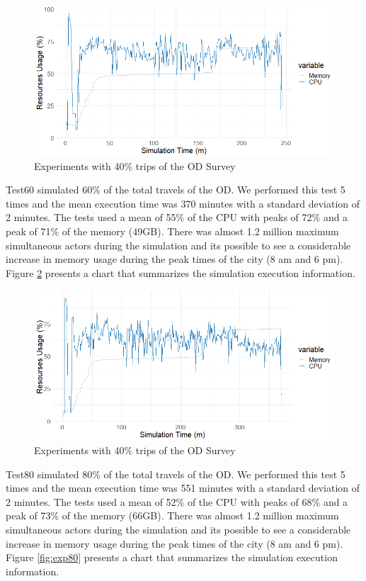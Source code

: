\begin{figure}[!htb]
\centering
\includegraphics[width=1\textwidth]{figuras/chap-exp/experiments40.png}
\caption{Experiments with 40\% trips of the OD Survey}
\label{fig:exp40}
\end{figure}

Test60 simulated 60\% of the total travels of the OD. We performed this test 5 times and the mean execution time was 370 minutes with a standard deviation of 2 minutes. The tests used a mean of 55\% of the CPU with peaks of 72\% and a peak of 71\% of the memory (49GB). There was almost 1.2 million maximum simultaneous actors during the simulation and its possible to see a considerable increase in memory usage during the peak times of the city (8 am and 6 pm). Figure \ref{fig:exp60} presents a chart that summarizes the simulation execution information. 

\begin{figure}[!htb]
\centering
\includegraphics[width=1\textwidth]{figuras/chap-exp/experiments60.png}
\caption{Experiments with 40\% trips of the OD Survey}
\label{fig:exp60}
\end{figure}

Test80 simulated 80\% of the total travels of the OD. We performed this test 5 times and the mean execution time was 551 minutes with a standard deviation of 2 minutes. The tests used a mean of 52\% of the CPU with peaks of 68\% and a peak of 73\% of the memory (66GB). There was almost 1.2 million maximum simultaneous actors during the simulation and its possible to see a considerable increase in memory usage during the peak times of the city (8 am and 6 pm). Figure \ref{fig:exp80} presents a chart that summarizes the simulation execution information. 

